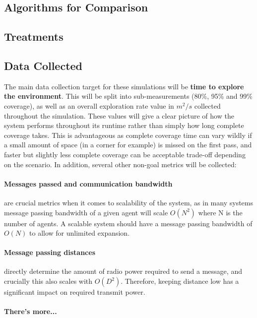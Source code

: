 \documentclass[runningheads]{llncs}
\begin{document}
\subsection{Algorithms for Comparison}



\subsection{Treatments}

\subsection{Data Collected}
The main data collection target for these simulations will be \textbf{time to explore the environment}. This will be split into sub-measurements (80\%, 95\% and 99\% coverage), as well as an overall exploration rate value in $m^2/s$ collected throughout the simulation. These values will give a clear picture of how the system performs throughout its runtime rather than simply how long complete coverage takes. This is advantageous as complete coverage time can vary wildly if a small amount of space (in a corner for example) is missed on the first pass, and faster but slightly less complete coverage can be acceptable trade-off depending on the scenario. In addition, several other non-goal metrics will be collected:

\paragraph{Messages passed and communication bandwidth} are crucial metrics when it comes to scalability of the system, as in many systems message passing bandwidth of a given agent will scale $O(N^2)$ where N is the number of agents. A scalable system should have a message passing bandwidth of $O(N)$ to allow for unlimited expansion.

\paragraph{Message passing distances} directly determine the amount of radio power required to send a message, and crucially this also scales with $O(D^2)$. Therefore, keeping distance low has a significant impact on required transmit power.

\paragraph{There's more...}
\end{document}

